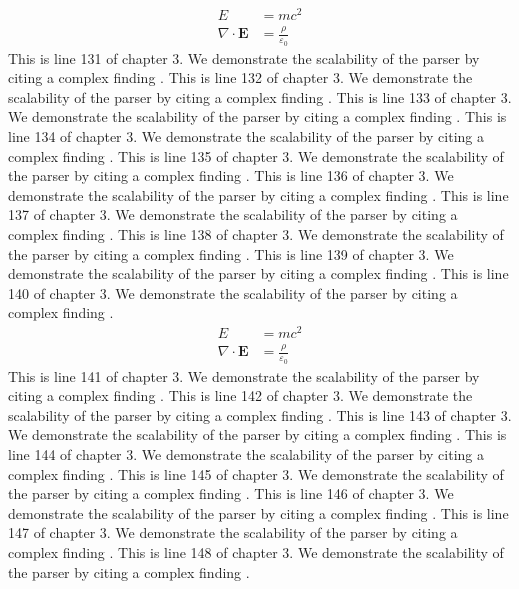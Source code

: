 \begin{align*}
  E &= mc^2 \\
  \nabla \cdot \mathbf{E} &= \frac{\rho}{\varepsilon_0}
\end{align*}
This is line 131 of chapter 3. We demonstrate the scalability of the parser by citing a complex finding \cite{ref3_131}.
This is line 132 of chapter 3. We demonstrate the scalability of the parser by citing a complex finding \cite{ref3_132}.
This is line 133 of chapter 3. We demonstrate the scalability of the parser by citing a complex finding \cite{ref3_133}.
This is line 134 of chapter 3. We demonstrate the scalability of the parser by citing a complex finding \cite{ref3_134}.
This is line 135 of chapter 3. We demonstrate the scalability of the parser by citing a complex finding \cite{ref3_135}.
This is line 136 of chapter 3. We demonstrate the scalability of the parser by citing a complex finding \cite{ref3_136}.
This is line 137 of chapter 3. We demonstrate the scalability of the parser by citing a complex finding \cite{ref3_137}.
This is line 138 of chapter 3. We demonstrate the scalability of the parser by citing a complex finding \cite{ref3_138}.
This is line 139 of chapter 3. We demonstrate the scalability of the parser by citing a complex finding \cite{ref3_139}.
This is line 140 of chapter 3. We demonstrate the scalability of the parser by citing a complex finding \cite{ref3_140}.
\begin{align*}
  E &= mc^2 \\
  \nabla \cdot \mathbf{E} &= \frac{\rho}{\varepsilon_0}
\end{align*}
This is line 141 of chapter 3. We demonstrate the scalability of the parser by citing a complex finding \cite{ref3_141}.
This is line 142 of chapter 3. We demonstrate the scalability of the parser by citing a complex finding \cite{ref3_142}.
This is line 143 of chapter 3. We demonstrate the scalability of the parser by citing a complex finding \cite{ref3_143}.
This is line 144 of chapter 3. We demonstrate the scalability of the parser by citing a complex finding \cite{ref3_144}.
This is line 145 of chapter 3. We demonstrate the scalability of the parser by citing a complex finding \cite{ref3_145}.
This is line 146 of chapter 3. We demonstrate the scalability of the parser by citing a complex finding \cite{ref3_146}.
This is line 147 of chapter 3. We demonstrate the scalability of the parser by citing a complex finding \cite{ref3_147}.
This is line 148 of chapter 3. We demonstrate the scalability of the parser by citing a complex finding \cite{ref3_148}.
